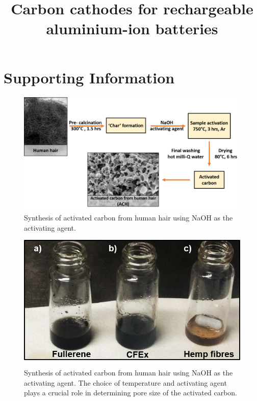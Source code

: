 \documentclass{article}
\title{Carbon cathodes for rechargeable aluminium-ion batteries}
\begin{document}
\section*{Supporting Information}
\newcommand{\beginsupplement}{
               \setcounter{figure}{0}
        \renewcommand{\thefigure}{S\arabic{figure}}
     }
\beginsupplement


\begin{figure}[tbh!]
  \centering
  \includegraphics[width=\textwidth]{SF/ACHsyn}
    \caption{Synthesis of activated carbon from human hair using NaOH as the activating agent.}
  \label{SF:ACHsyn}
\end{figure}
\begin{figure}[tbh!]
  \centering
  \includegraphics[width=\textwidth]{SF/CFExsol}
    \caption{Synthesis of activated carbon from human hair using NaOH as the activating agent. The choice of temperature and activating agent plays a crucial role in determining pore size of the activated carbon.}
  \label{SF:CFExsol}
\end{figure}
\end{document}
